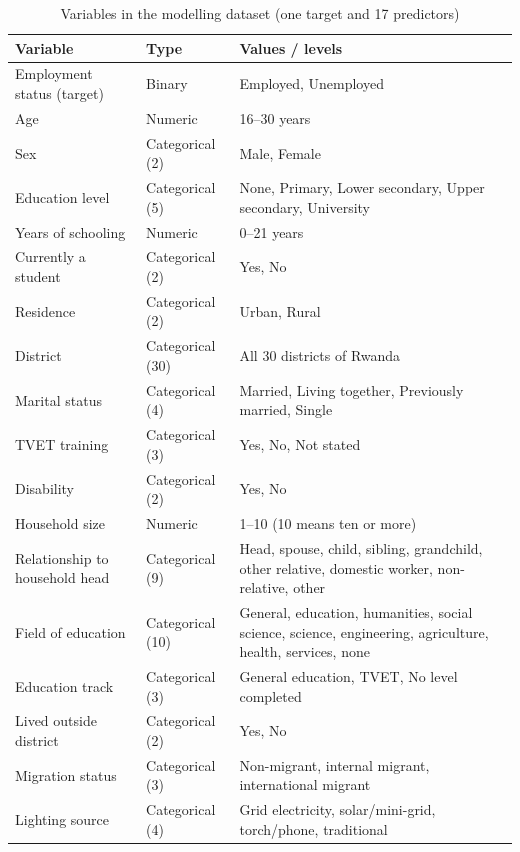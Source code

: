 \documentclass[11pt,a4paper]{article}
\begin{document}
\begin{table}[H]
\centering
\caption{Variables in the modelling dataset (one target and 17 predictors)}
\label{tab:vars}
\small
{}
\begin{tabularx}{\textwidth}{@{}l l Y@{}}
\toprule
\textbf{Variable} & \textbf{Type} & \textbf{Values / levels} \\
\midrule
Employment status (target) & Binary & Employed, Unemployed \\
Age & Numeric & 16--30 years \\
Sex & Categorical (2) & Male, Female \\
Education level & Categorical (5) & None, Primary, Lower secondary, Upper secondary, University \\
Years of schooling & Numeric & 0--21 years \\
Currently a student & Categorical (2) & Yes, No \\
Residence & Categorical (2) & Urban, Rural \\
District & Categorical (30) & All 30 districts of Rwanda \\
Marital status & Categorical (4) & Married, Living together, Previously married, Single \\
TVET training & Categorical (3) & Yes, No, Not stated \\
Disability & Categorical (2) & Yes, No \\
Household size & Numeric & 1--10 (10 means ten or more) \\
Relationship to household head & Categorical (9) & Head, spouse, child, sibling, grandchild, other relative, domestic worker, non-relative, other \\
Field of education & Categorical (10) & General, education, humanities, social science, science, engineering, agriculture, health, services, none \\
Education track & Categorical (3) & General education, TVET, No level completed \\
Lived outside district & Categorical (2) & Yes, No \\
Migration status & Categorical (3) & Non-migrant, internal migrant, international migrant \\
Lighting source & Categorical (4) & Grid electricity, solar/mini-grid, torch/phone, traditional \\
\bottomrule
\end{tabularx}
\end{table}
\end{document}
